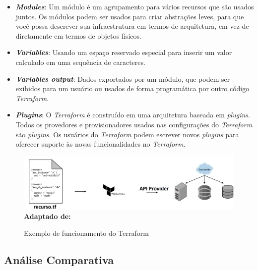 \begin{itemize}
\item \textbf{\textit{Modules}}: Um módulo é um agrupamento para vários recursos que são usados juntos. Os módulos podem ser usados para criar abstrações leves, para que você possa descrever sua infraestrutura em termos de arquitetura, em vez de diretamente em termos de objetos físicos.

\item \textbf{\textit{Variables}}: Usando um espaço reservado especial para inserir um valor calculado em uma sequência de caracteres. 

 \item \textbf{\textit{Variables output}}: Dados exportados por um módulo, que podem ser exibidos para um usuário  ou usados de forma programática por outro código \textit{Terraform}.
 
 \item \textbf{\textit{Plugins}}: O \textit{Terraform} é construído em uma arquitetura baseada em \textit{plugins}. Todos os provedores e provisionadores usados nas configurações do \textit{Terraform} são \textit{plugins}. Os usuários do \textit{Terraform} podem escrever novos \textit{plugins} para oferecer suporte às novas funcionalidades no \textit{Terraform}.
 \end{itemize}
  \cite{hashcorp2}
  \begin{figure}[H]
	\centering	
	\caption[\hspace{0.1cm}Exemplo de funcionamento do Terraform]{Exemplo de funcionamento do Terraform}
	\vspace{-0.4cm}
	\includegraphics[width=1.1\textwidth]{figuras/terraform-working.png}
	 \vspace{-0.2cm}
	\\\textbf{\footnotesize Adaptado de: \cite{oreilly}}
	\label{fig:figura8}
\end{figure}
\vspace{-0.5cm}


\subsection{ Análise Comparativa }

